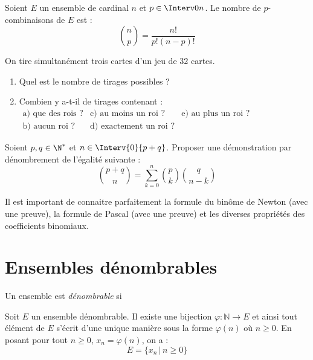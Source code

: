 \documentclass[a4paper,10pt]{report}
\begin{document}
\begin{Proposition}{} Soient $E$ un ensemble de cardinal $n$ et $p \in \Interv 0n$. Le nombre de $p$-combinaisons de $E$ est :
$$\binom{n}{p}  = \frac{n!}{p!(n-p)!}$$
\end{Proposition}

\begin{Exemple} On tire simultanément trois cartes d'un jeu de 32 cartes.
\begin{enumerate}
\item Quel est le nombre de tirages possibles ?

\vspace{2cm}
\newpage
\item Combien y a-t-il de tirages contenant :\\
$\begin{array}{lll}
\text{a) que des rois ?} & \text{c) au moins un roi ?} & \text{e) au plus un roi ?}\\
\text{b) aucun roi ?} & \text{d) exactement un roi ?} &
\end{array}$
\end{enumerate}

\vspace{7cm}
\end{Exemple}

\begin{ApplicationDirecte} Soient $p,q \in \N^*$ et $n \in \Interv{0}{p+q}$. Proposer une démonstration par dénombrement de l'égalité suivante :
  \[
  \binom{p + q}{n} = \sum_{k = 0}^{n} \binom{p}{k}\binom{q}{n - k}
  \]
\end{ApplicationDirecte}

\begin{Remarque}{} Il est important de connaitre parfaitement la formule du binôme de Newton (avec une preuve), la formule de Pascal (avec une preuve) et les diverses propriétés des coefficients binomiaux.
\end{Remarque}

\section{Ensembles dénombrables}


\begin{Definition}{} Un ensemble est \emph{dénombrable} si 
\end{Definition}

\begin{Remarque}{} Soit $E$ un ensemble dénombrable. Il existe une bijection $\varphi : \mathbb{N} \rightarrow E$ et ainsi tout élément de $E$ s'écrit d'une unique manière sous la forme $\varphi(n)$ où $n \geq 0$. En posant pour tout $n \geq 0$, $x_n= \varphi(n)$, on a :
$$ E = \lbrace x_n \, \vert \, n \geq 0 \rbrace$$
\end{Remarque}
\end{document}
